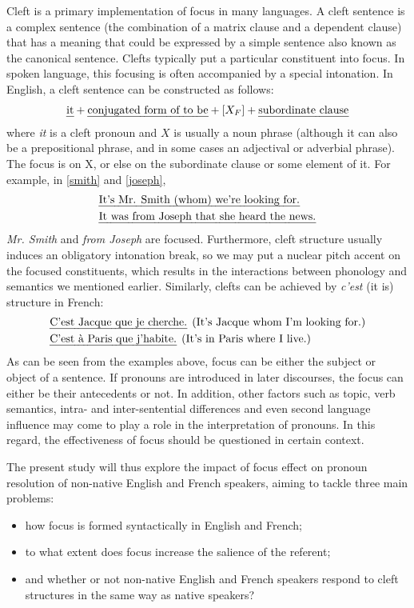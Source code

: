 Cleft is a primary implementation of focus in many languages. A cleft sentence is a complex sentence (the combination of a matrix clause and a dependent clause) that has a meaning that could be expressed by a simple sentence also known as the canonical sentence. Clefts typically put a particular constituent into focus. In spoken language, this focusing is often accompanied by a special intonation. In English, a cleft sentence can be constructed as follows:
\begin{align}
    \mbox{\emph{it}} + \mbox{\emph{conjugated form of to be}} + \left[X_F\right] + \mbox{\emph{subordinate clause}}
\end{align}
where \emph{it} is a cleft pronoun and $X$ is usually a noun phrase (although it can also be a prepositional phrase, and in some cases an adjectival or adverbial phrase). The focus is on X, or else on the subordinate clause or some element of it. For example, in \eqref{smith} and \eqref{joseph},
\begin{align}
    &\mbox{\emph{It's Mr. Smith (whom) we're looking for.}}\label{smith}\\
    &\mbox{\emph{It was from Joseph that she heard the news.}}\label{joseph}
\end{align}
\emph{Mr. Smith} and \emph{from Joseph} are focused. Furthermore, cleft structure usually induces an obligatory intonation break, so we may put a nuclear pitch accent on the focused constituents, which results in the interactions between phonology and semantics we mentioned earlier. Similarly, clefts can be achieved by \emph{c'est} (it is) structure in French:
\begin{align}
    &\mbox{\emph{C'est Jacque que je cherche.} (It's Jacque whom I'm looking for.)}\label{jacque}\\
    &\mbox{\emph{C'est à Paris que j'habite.} (It's in Paris where I live.)}\label{paris}
\end{align}
As can be seen from the examples above, focus can be either the subject or object of a sentence. If pronouns are introduced in later discourses, the focus can either be their antecedents or not. In addition, other factors such as topic, verb semantics, intra- and inter-sentential differences and even second language influence may come to play a role in the interpretation of pronouns. In this regard, the effectiveness of focus should be questioned in certain context.

The present study will thus explore the impact of focus effect on pronoun resolution of non-native English and French speakers, aiming to tackle three main problems:
\begin{itemize}
    \item how focus is formed syntactically in English and French;
    \item to what extent does focus increase the salience of the referent;
    \item and whether or not non-native English and French speakers respond to cleft structures in the same way as native speakers?
\end{itemize}